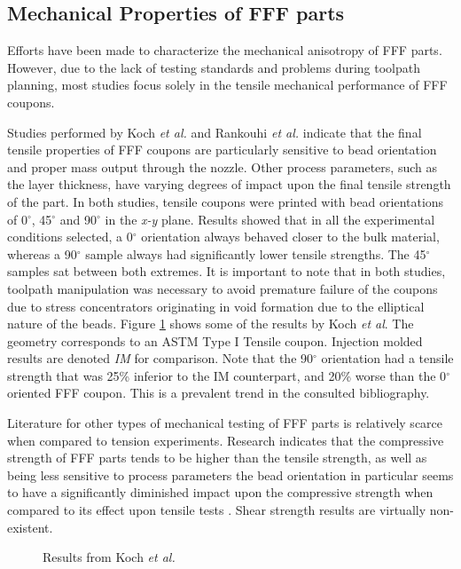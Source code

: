 \documentclass[main.tex]{subfiles}
\begin{document}
\subsection{Mechanical Properties of FFF parts}\label{ssec:mechPropFFF}

Efforts have been made to characterize the mechanical anisotropy of FFF parts. However, due to the lack of testing standards and problems during toolpath planning, most studies focus solely in the tensile mechanical performance of FFF coupons.

Studies performed by Koch \emph{et al.} \cite{Koch2017} and Rankouhi \emph{et al.} \cite{Rankouhi2016} indicate that the final tensile properties of FFF coupons are particularly sensitive to bead orientation and proper mass output through the nozzle. Other process parameters, such as the layer thickness, have varying degrees of impact upon the final tensile strength of the part. In both studies, tensile coupons were printed with bead orientations of 0$^\circ$, 45$^\circ$ and 90$^\circ$ in the \emph{x-y} plane. Results showed that in all the experimental conditions selected, a 0$^\circ$ orientation always behaved closer to the bulk material, whereas a 90$^\circ$ sample always had significantly lower tensile strengths. The 45$^\circ$ samples sat between both extremes. It is important to note that in both studies, toolpath manipulation was necessary to avoid premature failure of the coupons due to stress concentrators originating in void formation due to the elliptical nature of the beads. Figure \ref{fig:FFFmechProp} shows some of the results by Koch \emph{et al}. The geometry corresponds to an ASTM Type I Tensile coupon. Injection molded results are denoted \emph{IM} for comparison. Note that the 90$^\circ$ orientation had a tensile strength that was 25\% inferior to the IM counterpart, and 20\% worse than the 0$^\circ$ oriented FFF coupon. This is a prevalent trend in the consulted bibliography.

Literature for other types of mechanical testing of FFF parts is relatively scarce when compared to tension experiments. Research indicates that the compressive strength of FFF parts tends to be higher than the tensile strength, as well as being less sensitive to process parameters \textemdash the bead orientation in particular seems to have a significantly diminished impact upon the compressive strength when compared to its effect upon tensile tests \cite{Ahn2002,Lee2007}. Shear strength results are virtually non-existent.

\pagebreak
\begin{figure}[h]
	\center
	\hfill
	\caption{Results from Koch \emph{et al.} \cite{Koch2017}} \label{fig:FFFmechProp}
\end{figure}
\end{document}
